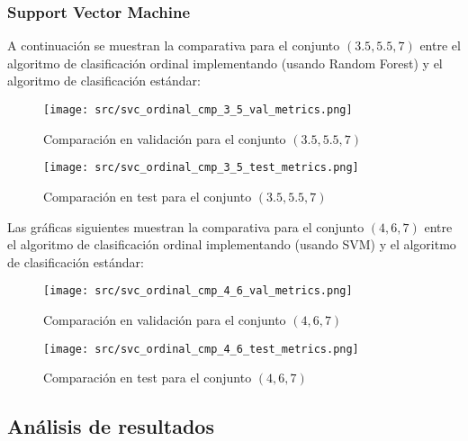 \subsubsection*{Support Vector Machine}
A continuación se muestran la comparativa para el conjunto $(3.5,5.5,7)$ entre el algoritmo de clasificación ordinal implementando  (usando Random Forest)  y el algoritmo de clasificación estándar:
\begin{figure}[H]
    \centering
    \texttt{[image: src/svc\_ordinal\_cmp\_3\_5\_val\_metrics.png]}
    \caption{Comparación en validación para el conjunto  $(3.5,5.5,7)$ }
    \label{fig:svc_ordin_val_cmp_1}
\end{figure}
\begin{figure}[H]
    \centering
    \texttt{[image: src/svc\_ordinal\_cmp\_3\_5\_test\_metrics.png]}
    \caption{Comparación en test para el conjunto  $(3.5,5.5,7)$}
    \label{fig:svc_ordin_test_cmp_1}
\end{figure}
Las gráficas siguientes muestran la comparativa para el conjunto $(4,6,7)$ entre el algoritmo de clasificación ordinal implementando  (usando SVM) y el algoritmo de clasificación estándar:
\begin{figure}[H]
    \centering
    \texttt{[image: src/svc\_ordinal\_cmp\_4\_6\_val\_metrics.png]}
    \caption{Comparación en validación para el conjunto $(4,6,7)$}
    \label{fig:svc_ordin_val_cmp_2}
\end{figure}
\begin{figure}[H]
    \centering
    \texttt{[image: src/svc\_ordinal\_cmp\_4\_6\_test\_metrics.png]}
    \caption{Comparación en test para el conjunto  $(4,6,7)$}
    \label{fig:svc_ordin_test_cmp_2}
\end{figure}
\subsection{Análisis de resultados}
